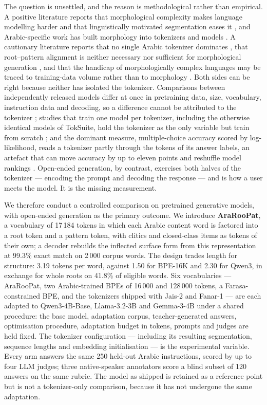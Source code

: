 \documentclass[a4paper,fleqn]{cas-sc}
\begin{document}
The question is unsettled, and the reason is methodological rather than empirical. A positive literature reports that morphological complexity makes language modelling harder and that linguistically motivated segmentation eases it \citep{park2021morphology,hofmann2021superbizarre,bostrom2020byte}, and Arabic-specific work has built morphology into tokenizers and models \citep{antoun2020arabert,alrefaie2024exploring,asgari2025morphbpe,asgari2026morphbpe}. A cautionary literature reports that no single Arabic tokenizer dominates \citep{alyafeai2023evaluating}, that root--pattern alignment is neither necessary nor sufficient for morphological generation \citep{alakeel2026morphemes}, and that the handicap of morphologically complex languages may be traced to training-data volume rather than to morphology \citep{arnett2025why}. Both sides can be right because neither has isolated the tokenizer. Comparisons between independently released models differ at once in pretraining data, size, vocabulary, instruction data and decoding, so a difference cannot be attributed to the tokenizer \citep{alakeel2026morphemes,reda2026yallamorph}; studies that train one model per tokenizer, including the otherwise identical models of TokSuite, hold the tokenizer as the only variable but train from scratch \citep{altintas2025toksuite}; and the dominant measure, multiple-choice accuracy scored by log-likelihood, reads a tokenizer partly through the tokens of its answer labels, an artefact that can move accuracy by up to eleven points and reshuffle model rankings \citep{zheng2024large,sanzguerrero2025mind}. Open-ended generation, by contrast, exercises both halves of the tokenizer --- encoding the prompt and decoding the response --- and is how a user meets the model. It is the missing measurement.

We therefore conduct a controlled comparison on pretrained generative models, with open-ended generation as the primary outcome. We introduce \textbf{AraRooPat}, a vocabulary of 17\,184 tokens in which each Arabic content word is factored into a root token and a pattern token, with clitics and closed-class items as tokens of their own; a decoder rebuilds the inflected surface form from this representation at 99.3\% exact match on 2\,000 corpus words. The design trades length for structure: 3.19 tokens per word, against 1.50 for BPE-16K and 2.30 for Qwen3, in exchange for whole roots on 41.8\% of eligible words. Six vocabularies --- AraRooPat, two Arabic-trained BPEs of 16\,000 and 128\,000 tokens, a Farasa-constrained BPE, and the tokenizers shipped with Jais-2 and Fanar-1 --- are each adapted to Qwen3-4B-Base, Llama-3.2-3B and Gemma-3-4B under a shared procedure: the base model, adaptation corpus, teacher-generated answers, optimisation procedure, adaptation budget in tokens, prompts and judges are held fixed. The tokenizer configuration --- including its resulting segmentation, sequence lengths and embedding initialisation --- is the experimental variable. Every arm answers the same 250 held-out Arabic instructions, scored by up to four LLM judges; three native-speaker annotators score a blind subset of 120 answers on the same rubric. The model as shipped is retained as a reference point but is not a tokenizer-only comparison, because it has not undergone the same adaptation.
\end{document}
